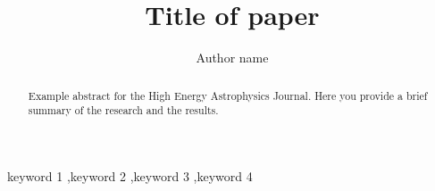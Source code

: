 \documentclass[final,5p,times,twocolumn,authoryear, draft]{elsarticle}
\begin{document}
\begin{frontmatter}



\title{Title of paper}


\author[first]{Author name}

\begin{abstract}
Example abstract for the High Energy Astrophysics Journal. Here you provide a brief summary of the research and the results.
\end{abstract}



\begin{keyword}
keyword 1 \sep keyword 2 \sep keyword 3 \sep keyword 4



\end{keyword}


\end{frontmatter}
\end{document}
